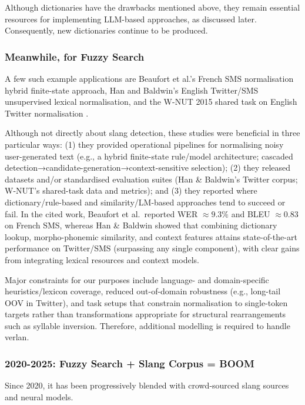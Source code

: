 \documentclass[12pt]{article}
\begin{document}
Although dictionaries have the drawbacks mentioned above, they remain essential resources for implementing LLM-based approaches, as discussed later. Consequently, new dictionaries continue to be produced.


\subsubsection{Meanwhile, for Fuzzy Search}

A few such example applications are Beaufort et al.'s French SMS normalisation hybrid finite-state approach, Han and Baldwin's English Twitter/SMS unsupervised lexical normalisation, and the W-NUT 2015 shared task on English Twitter normalisation \cite{beaufort2010hybrid,han2011lexical,baldwin2015shared}.

Although not directly about slang detection, these studies were beneficial in three particular ways: (1) they provided operational pipelines for normalising noisy user-generated text (e.g., a hybrid finite-state rule/model architecture; cascaded detection→candidate-generation→context-sensitive selection); (2) they released datasets and/or standardised evaluation suites (Han \& Baldwin's Twitter corpus; W-NUT's shared-task data and metrics); and (3) they reported where dictionary/rule-based and similarity/LM-based approaches tend to succeed or fail. In the cited work, Beaufort et al.\ reported WER $\approx 9.3\%$ and BLEU $\approx 0.83$ on French SMS, whereas Han \& Baldwin showed that combining dictionary lookup, morpho-phonemic similarity, and context features attains state-of-the-art performance on Twitter/SMS (surpassing any single component), with clear gains from integrating lexical resources and context models.

Major constraints for our purposes include language- and domain-specific heuristics/lexicon coverage, reduced out-of-domain robustness (e.g., long-tail OOV in Twitter), and task setups that constrain normalisation to single-token targets rather than transformations appropriate for structural rearrangements such as syllable inversion. Therefore, additional modelling is required to handle verlan.


\subsubsection{2020-2025: Fuzzy Search + Slang Corpus = BOOM}

Since 2020, it has been progressively blended with crowd-sourced slang sources and neural models.
\end{document}
